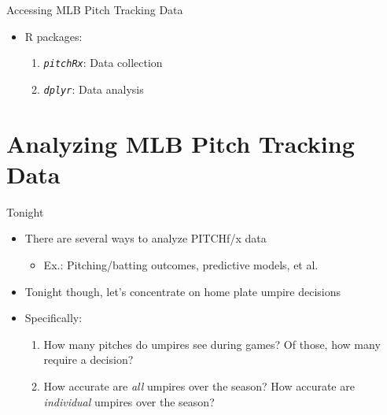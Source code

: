 \documentclass[14pt,ignorenonframetext,aspectratio = 1610]{beamer}
\providecommand{\tightlist}{%
\setlength{\itemsep}{0pt}\setlength{\parskip}{0pt}}
\begin{document}
\begin{frame}[fragile]{Accessing MLB Pitch Tracking Data}

\begin{itemize}
\tightlist
\item
  R packages:

  \begin{enumerate}
  \def\labelenumi{\arabic{enumi}.}
  \tightlist
  \item
    \emph{\texttt{pitchRx}}: Data collection
  \item
    \emph{\texttt{dplyr}}: Data analysis
  \end{enumerate}
\end{itemize}

\end{frame}

\section{Analyzing MLB Pitch Tracking
Data}\label{analyzing-mlb-pitch-tracking-data}

\begin{frame}{Tonight}

\begin{itemize}
\tightlist
\item
  There are several ways to analyze PITCHf/x data

  \begin{itemize}
  \tightlist
  \item
    Ex.: Pitching/batting outcomes, predictive models, et al.
  \end{itemize}
\item
  Tonight though, let's concentrate on home plate umpire decisions
\item
  Specifically:

  \begin{enumerate}
  \def\labelenumi{\arabic{enumi}.}
  \tightlist
  \item
    How many pitches do umpires see during games? Of those, how many
    require a decision?
  \item
    How accurate are \emph{all} umpires over the season? How accurate
    are \emph{individual} umpires over the season?
  \end{enumerate}
\end{itemize}

\end{frame}
\end{document}

